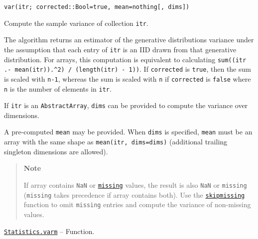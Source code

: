 \begin{adjustwidth}{2em}{0pt}


\begin{verbatim}
var(itr; corrected::Bool=true, mean=nothing[, dims])
\end{verbatim}

Compute the sample variance of collection \texttt{itr}.

The algorithm returns an estimator of the generative distribution{\textquotesingle}s variance under the assumption that each entry of \texttt{itr} is an IID drawn from that generative distribution. For arrays, this computation is equivalent to calculating \texttt{sum((itr .- mean(itr)).{\textasciicircum}2) / (length(itr) - 1))}. If \texttt{corrected} is \texttt{true}, then the sum is scaled with \texttt{n-1}, whereas the sum is scaled with \texttt{n} if \texttt{corrected} is \texttt{false} where \texttt{n} is the number of elements in \texttt{itr}.

If \texttt{itr} is an \texttt{AbstractArray}, \texttt{dims} can be provided to compute the variance over dimensions.

A pre-computed \texttt{mean} may be provided. When \texttt{dims} is specified, \texttt{mean} must be an array with the same shape as \texttt{mean(itr, dims=dims)} (additional trailing singleton dimensions are allowed).

\begin{quote}
\textbf{Note}

If array contains \texttt{NaN} or \hyperlink{14596725676261444434}{\texttt{missing}} values, the result is also \texttt{NaN} or \texttt{missing} (\texttt{missing} takes precedence if array contains both). Use the \hyperlink{2012470681884771400}{\texttt{skipmissing}} function to omit \texttt{missing} entries and compute the variance of non-missing values.

\end{quote}


\end{adjustwidth}
\hypertarget{11347311999392006255}{}
\hyperlink{11347311999392006255}{\texttt{Statistics.varm}}  -- {Function.}


